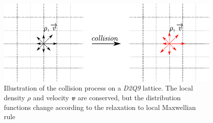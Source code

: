 \begin{figure}[htbp]
\centering
\includegraphics{Chapter3/figures/lbm/collision.pdf}
\caption[Illustration of the collision process on a \textit{D2Q9} lattice]{Illustration of the collision process on a \textit{D2Q9} lattice. The local density $\rho$ and velocity $\textit{\textbf{v}}$ are conserved, but the distribution functions change according to the relaxation to local Maxwellian rule}
\label{fig:collision}
\end{figure} 

